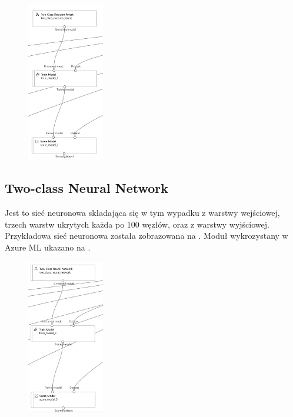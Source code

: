 \begin{figure}[H]
    \centering
    \includegraphics[width=0.3\textwidth]{images/df_pipe}
    \label{fig:df-pipe}
\end{figure}


\subsection{Two-class Neural Network}
Jest to sieć neuronowa składająca się w tym wypadku z warstwy wejściowej, trzech warstw ukrytych każda po 100 węzłów, oraz z warstwy wyjściowej. Przykładowa sieć neuronowa została zobrazowana na . Moduł wykrozystany w Azure ML ukazano na .

\begin{figure}[H]
    \centering
    \includegraphics[width=0.3\textwidth]{images/nn_pipe}
    \label{fig:nn-pipe}
\end{figure}

